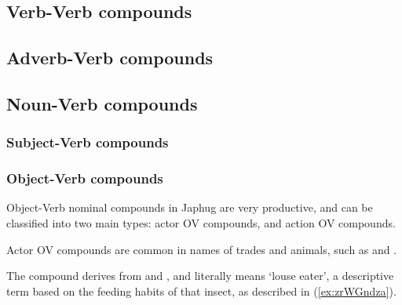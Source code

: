\subsection{Verb-Verb compounds} \label{sec.v.v.compounds}
\subsection{Adverb-Verb compounds} \label{sec.adv.v.compounds}
\subsection{Noun-Verb compounds} \label{sec.n.v.compounds}
\subsubsection{Subject-Verb compounds} \label{sec:subject.verb.compounds}



\subsubsection{Object-Verb compounds} \label{sec:object.verb.compounds}
Object-Verb nominal compounds in Japhug are very productive, and can be classified into two main types: actor OV compounds, and action OV compounds.

Actor OV compounds are common in names of trades and animals, such as  and . 

The compound  derives from  and , and literally means `louse eater', a descriptive term based on the feeding habits of that insect, as described in (\ref{ex:zrWGndza}).

